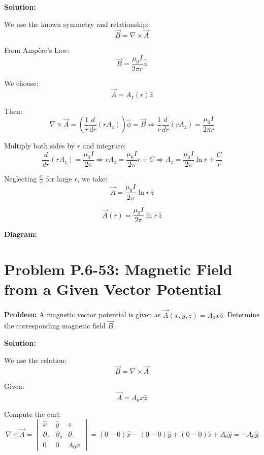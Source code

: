 \documentclass[12pt]{article}
\begin{document}
\textbf{Solution:}

We use the known symmetry and relationship:
\[
\vec{B} = \nabla \times \vec{A}
\]

From Ampère’s Law:
\[
\vec{B} = \frac{\mu_0 I}{2\pi r} \hat{\phi}
\]

We choose:
\[
\vec{A} = A_z(r) \hat{z}
\]

Then:
\[
\nabla \times \vec{A} = \left( \frac{1}{r} \frac{d}{dr}(r A_z) \right) \hat{\phi} = \vec{B}
\Rightarrow \frac{1}{r} \frac{d}{dr}(r A_z) = \frac{\mu_0 I}{2\pi r}
\]

Multiply both sides by \( r \) and integrate:
\[
\frac{d}{dr}(r A_z) = \frac{\mu_0 I}{2\pi} \Rightarrow r A_z = \frac{\mu_0 I}{2\pi} r + C
\Rightarrow A_z = \frac{\mu_0 I}{2\pi} \ln r + \frac{C}{r}
\]

Neglecting \( \frac{C}{r} \) for large \( r \), we take:
\[
\vec{A} = \frac{\mu_0 I}{2\pi} \ln r \, \hat{z}
\]

\begin{tcolorbox}
\[
\boxed{\vec{A}(r) = \frac{\mu_0 I}{2\pi} \ln r \, \hat{z}}
\]
\end{tcolorbox}

\textbf{Diagram:}
\begin{center}
\end{center}



\section*{Problem P.6-53: Magnetic Field from a Given Vector Potential}

\textbf{Problem:}  
A magnetic vector potential is given as \( \vec{A}(x, y, z) = A_0 x \hat{z} \). Determine the corresponding magnetic field \( \vec{B} \).

\textbf{Solution:}

We use the relation:
\[
\vec{B} = \nabla \times \vec{A}
\]

Given:
\[
\vec{A} = A_0 x \hat{z}
\]

Compute the curl:
\[
\nabla \times \vec{A} =
\begin{vmatrix}
\hat{x} & \hat{y} & \hat{z} \\
\partial_x & \partial_y & \partial_z \\
0 & 0 & A_0 x
\end{vmatrix}
= \left( 0 - 0 \right)\hat{x} - \left( 0 - 0 \right)\hat{y} + \left( 0 - 0 \right)\hat{z} + A_0 \hat{y}
= -A_0 \hat{y}
\]
\end{document}
